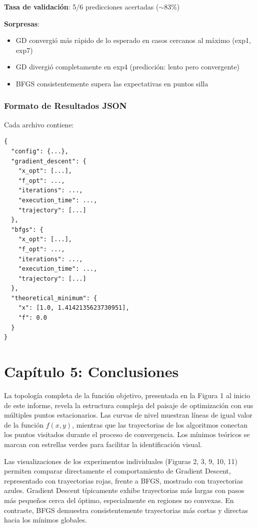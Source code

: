 \documentclass[12pt,a4paper]{article}
\begin{document}
\textbf{Tasa de validación}: 5/6 predicciones acertadas ($\sim$83\%)

\textbf{Sorpresas}:
\begin{itemize}
    \item GD convergió más rápido de lo esperado en casos cercanos al máximo (exp1, exp7)
    \item GD divergió completamente en exp4 (predicción: lento pero convergente)
    \item BFGS consistentemente supera las expectativas en puntos silla
\end{itemize}

\subsubsection*{Formato de Resultados JSON}

Cada archivo contiene:

\begin{verbatim}
{
  "config": {...},
  "gradient_descent": {
    "x_opt": [...],
    "f_opt": ...,
    "iterations": ...,
    "execution_time": ...,
    "trajectory": [...]
  },
  "bfgs": {
    "x_opt": [...],
    "f_opt": ...,
    "iterations": ...,
    "execution_time": ...,
    "trajectory": [...]
  },
  "theoretical_minimum": {
    "x": [1.0, 1.4142135623730951],
    "f": 0.0
  }
}
\end{verbatim}

\newpage

\section*{Capítulo 5: Conclusiones}

La topología completa de la función objetivo, presentada en la Figura 1 al inicio de este informe, revela la estructura compleja del paisaje de optimización con sus múltiples puntos estacionarios. Las curvas de nivel muestran líneas de igual valor de la función $f(x,y)$, mientras que las trayectorias de los algoritmos conectan los puntos visitados durante el proceso de convergencia. Los mínimos teóricos se marcan con estrellas verdes para facilitar la identificación visual.

Las visualizaciones de los experimentos individuales (Figuras 2, 3, 9, 10, 11) permiten comparar directamente el comportamiento de Gradient Descent, representado con trayectorias rojas, frente a BFGS, mostrado con trayectorias azules. Gradient Descent típicamente exhibe trayectorias más largas con pasos más pequeños cerca del óptimo, especialmente en regiones no convexas. En contraste, BFGS demuestra consistentemente trayectorias más cortas y directas hacia los mínimos globales.
\end{document}
